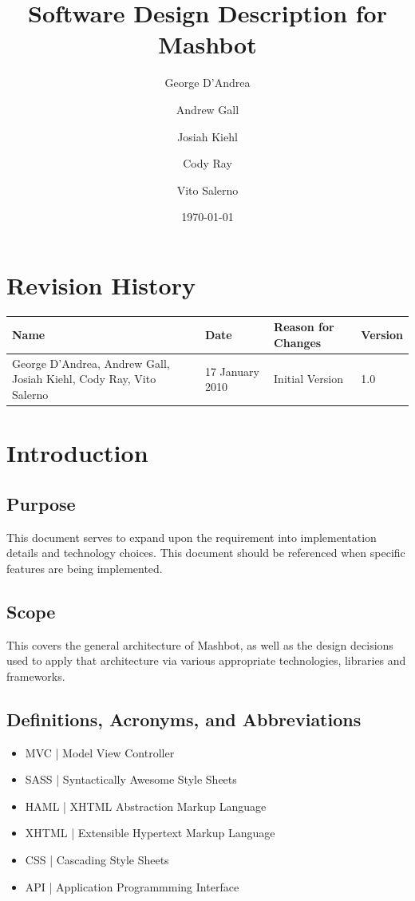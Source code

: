 \documentclass{report}
\title{Software Design Description for Mashbot}
\author{George D'Andrea \and Andrew Gall \and Josiah Kiehl \and
  Cody Ray \and Vito Salerno}
\date{\today}
\begin{document}
\begin{titlepage}
\maketitle
\end{titlepage}


\chapter*{Revision History}
\begin{tabular}{|p{2in}|l|l|l|}
  \hline
  \textbf{Name} & \textbf{Date} & \textbf{Reason for Changes} & \textbf{Version} \\
  \hline \hline
  George D'Andrea, Andrew Gall, Josiah Kiehl, Cody Ray, Vito
  Salerno & 17 January 2010 & Initial Version & 1.0 \\
  \hline
\end{tabular}

\clearpage
\tableofcontents
\clearpage

\chapter{Introduction}
\section{Purpose}
This document serves to expand upon the requirement into implementation details and technology choices.  This document should be referenced when specific features are being implemented.
\section{Scope}
This covers the general architecture of Mashbot, as well as the design decisions used to apply that architecture via various appropriate technologies, libraries and frameworks.
\section{Definitions, Acronyms,   and Abbreviations}
\begin{itemize}
\item MVC | Model View Controller
\item SASS | Syntactically Awesome Style Sheets
\item HAML | XHTML Abstraction Markup Language
\item XHTML | Extensible Hypertext Markup Language
\item CSS | Cascading Style Sheets
\item API | Application Programmming Interface
\end{itemize}
\end{document}
